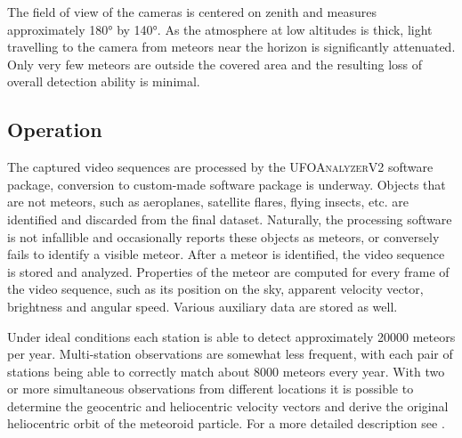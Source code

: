         The field of view of the cameras is centered on zenith and measures approximately \ang{180} by \ang{140}.
        As the atmosphere at low altitudes is thick, light travelling to the camera from
        meteors near the horizon is significantly attenuated.
        Only very few meteors are outside the covered area and the resulting loss of overall detection ability is minimal.

    \subsection{Operation} \label{iAo}
        The captured video sequences are processed by the \textsc{UFOAnalyzerV2} software package,
        conversion to custom-made software package is underway.
        Objects that are not meteors, such as aeroplanes, satellite flares, flying insects, etc.
        are identified and discarded from the final dataset. Naturally, the processing software is not
        infallible and occasionally reports these objects as meteors, or conversely fails to identify a visible meteor.
        After a meteor is identified, the video sequence is stored and analyzed.
        Properties of the meteor are computed for every frame of the video sequence,
        such as its position on the sky, apparent velocity vector, brightness and angular speed.
        Various auxiliary data are stored as well.

        Under ideal conditions each station is able to detect approximately 20000 meteors per year.
        Multi-station observations are somewhat less frequent, with each pair of stations being able
        to correctly match about 8000 meteors every year.
        With two or more simultaneous observations from different locations it is possible to determine
        the geocentric and heliocentric velocity vectors and derive the original heliocentric orbit of the meteoroid particle.
        For a more detailed description see \citet{fero?}.

